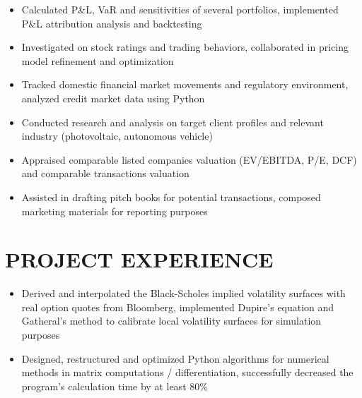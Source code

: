 \documentclass[classic]{resume}
\begin{document}
    \begin{itemize}
        \item Calculated P\&L, VaR and sensitivities of several portfolios, implemented P\&L attribution analysis and backtesting
        \item Investigated on stock ratings and trading behaviors, collaborated in pricing model refinement and optimization
        \item Tracked domestic financial market movements and regulatory environment, analyzed credit market data using Python
    \end{itemize}

    \begin{itemize}
        \item Conducted research and analysis on target client profiles and relevant industry (photovoltaic, autonomous vehicle)
        \item Appraised comparable listed companies valuation (EV/EBITDA, P/E, DCF) and comparable transactions valuation
        \item Assisted in drafting pitch books for potential transactions, composed marketing materials for reporting purposes
    \end{itemize}
    \section{PROJECT EXPERIENCE}
    \begin{itemize}
        \item Derived and interpolated the Black-Scholes implied volatility surfaces with real option quotes from Bloomberg, implemented Dupire's equation and Gatheral's method to calibrate local volatility surfaces for simulation purposes
        \item Designed, restructured and optimized Python algorithms for numerical methods in matrix computations / differentiation, successfully decreased the program's calculation time by at least 80\%
    \end{itemize}
\end{document}
